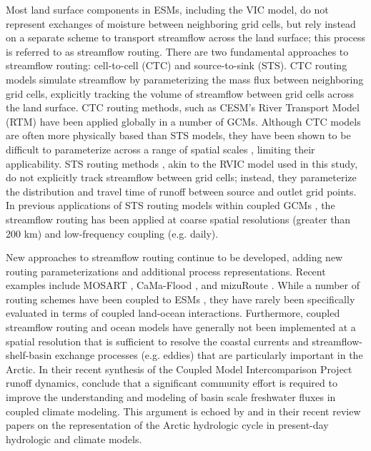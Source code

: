 Most land surface components in ESMs, including the VIC model, do not represent exchanges of moisture between neighboring grid cells, but rely instead on a separate scheme to transport streamflow across the land surface; this process is referred to as streamflow routing.
There are two fundamental approaches to streamflow routing: cell-to-cell (CTC) and source-to-sink (STS).
CTC routing models simulate streamflow by parameterizing the mass flux between neighboring grid cells, explicitly tracking the volume of streamflow between grid cells across the land surface.
CTC routing methods, such as CESM's River Transport Model (RTM) \citep{Branstetter_2003} have been applied globally in a number of GCMs.
Although CTC models are often more physically based than STS models, they have been shown to be difficult to parameterize across a range of spatial scales \citep{Sushama_2004}, limiting their applicability.
STS routing methods \citep[e.g.][]{Lohmann_1996,Naden_1992}, akin to the RVIC model used in this study, do not explicitly track streamflow between grid cells; instead, they parameterize the distribution and travel time of runoff between source and outlet grid points.
In previous applications of STS routing models within coupled GCMs \citep[e.g.][]{Olivera_2000}, the streamflow routing has been applied at coarse spatial resolutions (greater than 200 km) and low-frequency coupling (e.g. daily).

New approaches to streamflow routing continue to be developed, adding new routing parameterizations and additional process representations.
Recent examples include MOSART \citep{Li_2013}, CaMa-Flood \citep{Yamazaki_2009,Yamazaki_2014}, and mizuRoute \citep{Clark_2016}.
While a number of routing schemes have been coupled to ESMs \citep[e.g.][]{Sushama_2004,Olivera_2000,Li_2013}, they have rarely been specifically evaluated in terms of coupled land-ocean interactions.
Furthermore, coupled streamflow routing and ocean models have generally not been implemented at a spatial resolution that is sufficient to resolve the coastal currents and streamflow-shelf-basin exchange processes (e.g. eddies) that are particularly important in the Arctic.
In their recent synthesis of the Coupled Model Intercomparison Project \citep[CMIP5; ][]{Taylor_2012} runoff dynamics, \citet{Bring_2015} conclude that a significant community effort is required to improve the understanding and modeling of basin scale freshwater fluxes in coupled climate modeling.
This argument is echoed by \citet{Lique_2015} and \citet{Bring_2016} in their recent review papers on the representation of the Arctic hydrologic cycle in present-day hydrologic and climate models.

